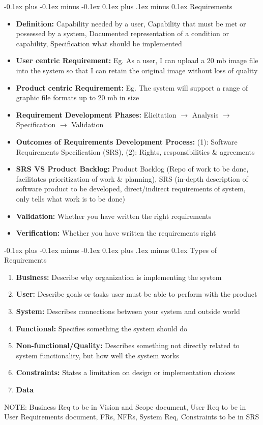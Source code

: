 \documentclass[landscape]{article}
\makeatletter
\renewcommand{\subsection}{\@startsection{subsection}{2}{0mm}%
  {-0.1ex plus -0.1ex minus -0.1ex}%
  {0.1ex plus .1ex minus 0.1ex}%
{\normalfont\scriptsize\bfseries}}
\makeatother
\begin{document}
\begin{multicols*}{5}
    \subsection{Requirements}
    \begin{itemize}
      \item \textbf{Definition:} Capability needed by a user, Capability that must be met or possessed by a system, Documented representation of a condition or capability, Specification what should be implemented
      \item \textbf{User centric Requirement:} Eg. As a user, I can upload a 20 mb image file into the system so that I can retain the original image without loss of quality
      \item \textbf{Product centric Requirement:} Eg. The system will support a range of graphic file formats up to 20 mb in size
      \item \textbf{Requirement Development Phases:} Elicitation $\rightarrow$ Analysis $\rightarrow$ Specification $\rightarrow$ Validation
      \item \textbf{Outcomes of Requirements Development Process:} (1): Software Requirements Specification (SRS), (2): Rights, responsibilities \& agreements
      \item \textbf{SRS VS Product Backlog:} Product Backlog (Repo of work to be done, facilitates prioritization of work \& planning), SRS (in-depth description of software product to be developed, direct/indirect requirements of system, only tells what work is to be done)
      \item \textbf{Validation:} Whether you have written the right requirements
      \item \textbf{Verification:} Whether you have written the requirements right
    \end{itemize}

    \subsection{Types of Requirements}
    \begin{enumerate}
      \item \textbf{Business:} Describe why organization is implementing the system
      \item \textbf{User:} Describe goals or tasks user must be able to perform with the product
      \item \textbf{System:} Describes connections between your system and outside world
      \item \textbf{Functional:} Specifies something the system should do
      \item \textbf{Non-functional/Quality:} Describes something not directly related to system functionality, but how well the system works
      \item \textbf{Constraints:} States a limitation on design or implementation choices
      \item \textbf{Data}
    \end{enumerate}
    NOTE: Business Req to be in Vision and Scope document, User Req to be in User Requirements document, FRs, NFRs, System Req, Constraints to be in SRS


\end{multicols*}
\end{document}
